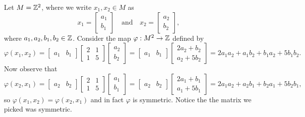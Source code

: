 \begin{example}
  Let $M = \mathbb{Z}^2$, where we write $x_1, x_2 \in M$
  as
  \[
    x_1 = \begin{bmatrix} a_1 \\ b_1 \end{bmatrix}
    \quad \text{and} \quad
    x_2 = \begin{bmatrix} a_2 \\ b_2 \end{bmatrix},
  \]
  where $a_1, a_2, b_1, b_2 \in \mathbb{Z}$. Consider the map
  $\varphi : M^2 \to \mathbb{Z}$  defined by
  \[
    \varphi(x_1, x_2) =
    \begin{bmatrix}
      a_1 & b_1
    \end{bmatrix}
    \begin{bmatrix}
      2 & 1 \\ 1 & 5
    \end{bmatrix}
    \begin{bmatrix}
      a_2 \\ b_2
    \end{bmatrix}
    =
    \begin{bmatrix}
      a_1 & b_1
    \end{bmatrix}
    \begin{bmatrix}
      2a_2 + b_2 \\ a_2 + 5b_2
    \end{bmatrix}
    = 2a_1a_2 + a_1b_2 + b_1a_2 + 5b_1b_2.
  \]
  Now observe that
  \[
    \varphi(x_2, x_1) =
    \begin{bmatrix}
      a_2 & b_2
    \end{bmatrix}
    \begin{bmatrix}
      2 & 1 \\ 1 & 5
    \end{bmatrix}
    \begin{bmatrix}
      a_1 \\ b_1
    \end{bmatrix}
    =
    \begin{bmatrix}
      a_2 & b_2
    \end{bmatrix}
    \begin{bmatrix}
      2a_1 + b_1 \\ a_1 + 5b_1
    \end{bmatrix}
    = 2a_1a_2 + a_2b_1 + b_2a_1 + 5b_2b_1,
  \]
  so $\varphi(x_1, x_2) = \varphi(x_2, x_1)$ and in
  fact $\varphi$ is symmetric. Notice the the matrix
  we picked was symmetric.
\end{example}

